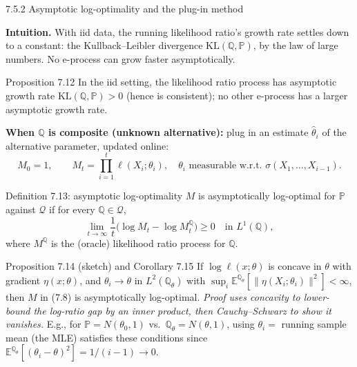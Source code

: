 \documentclass[aspectratio=169,10pt]{beamer}
\begin{document}
\begin{frame}[allowframebreaks]{7.5.2 Asymptotic log-optimality and the plug-in method}

\textbf{Intuition.} With iid data, the running likelihood ratio's growth rate settles down to a constant: the
Kullback--Leibler divergence $\mathrm{KL}(\mathbb Q,\mathbb P)$, by the law of large numbers. No e-process can grow
faster asymptotically.

\begin{block}{Proposition 7.12}
In the iid setting, the likelihood ratio process has asymptotic growth rate $\mathrm{KL}(\mathbb Q,\mathbb P) > 0$
(hence is consistent); no other e-process has a larger asymptotic growth rate.
\end{block}

\textbf{When $\mathbb Q$ is composite (unknown alternative):} plug in an estimate $\hat\theta_i$ of the alternative
parameter, updated online:
\begin{equation}
M_0=1, \qquad M_t = \prod_{i=1}^t \ell(X_i;\theta_i), \quad \theta_i \text{ measurable w.r.t.\ } \sigma(X_1,\dots,X_{i-1}).
\tag{7.8}
\end{equation}

\framebreak

\begin{block}{Definition 7.13: asymptotic log-optimality}
$M$ is asymptotically log-optimal for $\mathbb P$ against $\mathcal Q$ if for every $\mathbb Q \in \mathcal Q$,
$$\lim_{t\to\infty} \frac1t\big(\log M_t - \log M_t^{\mathbb Q}\big) \ge 0 \quad \text{in } L^1(\mathbb Q),$$
where $M^{\mathbb Q}$ is the (oracle) likelihood ratio process for $\mathbb Q$.
\end{block}

\begin{block}{Proposition 7.14 (sketch) and Corollary 7.15}
If $\log \ell(x;\theta)$ is concave in $\theta$ with gradient $\eta(x;\theta)$, and $\theta_i \to \theta$ in
$L^2(\mathbb Q_\theta)$ with $\sup_i \mathbb E^{\mathbb Q_\theta}[\|\eta(X_i;\theta_i)\|^2] < \infty$, then $M$ in
(7.8) is asymptotically log-optimal. \emph{Proof uses concavity to lower-bound the log-ratio gap by an inner
product, then Cauchy--Schwarz to show it vanishes.} E.g., for $\mathbb P = N(\theta_0,1)$ vs.\ $\mathbb Q_\theta =
N(\theta,1)$, using $\theta_i=$ running sample mean (the MLE) satisfies these conditions since
$\mathbb E^{\mathbb Q_\theta}[(\theta_i-\theta)^2] = 1/(i-1) \to 0$.
\end{block}

\end{frame}
\end{document}
